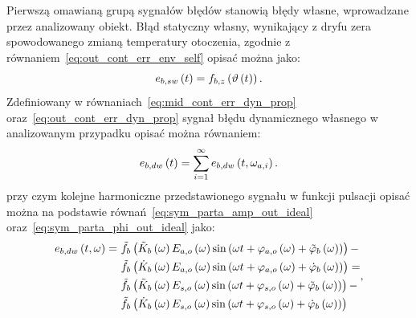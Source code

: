Pierwszą omawianą grupą sygnałów błędów stanowią błędy własne, wprowadzane przez analizowany obiekt. Błąd statyczny własny, wynikający z dryfu zera spowodowanego zmianą temperatury otoczenia, zgodnie z równaniem~\eqref{eq:out_cont_err_env_self} opisać można jako:
\begin{equation}
e_{b,sw} \left(t\right) = f_{b,z} \left( \vartheta \left(t\right) \right) \label{eq:sym_partb_err_sw}.
\end{equation}
Zdefiniowany w równaniach~\eqref{eq:mid_cont_err_dyn_prop} oraz~\eqref{eq:out_cont_err_dyn_prop} sygnał błędu dynamicznego własnego w analizowanym przypadku opisać można równaniem:
\begin{equation}
e_{b,dw} \left(t\right) = \sum _{i = 1} ^{\infty} e_{b,dw} \left(t,\omega_{a,i}\right) \label{eq:sym_partb_dyn_self_sum}.
\end{equation}
przy czym kolejne harmoniczne przedstawionego sygnału w funkcji pulsacji opisać można na podstawie równań~\eqref{eq:sym_parta_amp_out_ideal} oraz~\eqref{eq:sym_parta_phi_out_ideal} jako:
\begin{equation}
\begin{split}
e_{b,dw} \left(t,\omega\right) =~
& \tilde{f}_{b} \left( \tilde{K}_{b} \left(\omega\right) E_{a,o} \left(\omega\right) \sin \left( \omega t + \varphi_{a,o} \left(\omega\right) + \tilde{\varphi}_{b} \left(\omega\right) \right) \right)- \\
& \tilde{f}_{b} \left( \dot{K}_{b} \left(\omega\right) E_{a,o} \left(\omega\right) \sin \left( \omega t + \varphi_{a,o} \left(\omega\right) + \dot{\varphi}_{b} \left(\omega\right) \right) \right) = \\
& \tilde{f}_{b} \left( \tilde{K}_{b} \left(\omega\right) E_{s,o} \left(\omega\right) \sin \left( \omega t + \varphi_{s,o} \left(\omega\right) + \tilde{\varphi}_{b} \left(\omega\right) \right) \right) - \\
& \tilde{f}_{b} \left( \dot{K}_{b} \left(\omega\right) E_{s,o} \left(\omega\right) \sin \left( \omega t + \varphi_{s,o} \left(\omega\right) + \dot{\varphi}_{b} \left(\omega\right) \right) \right)
\end{split}
\label{eq:sym_partb_dyn_self_err},
\end{equation}

